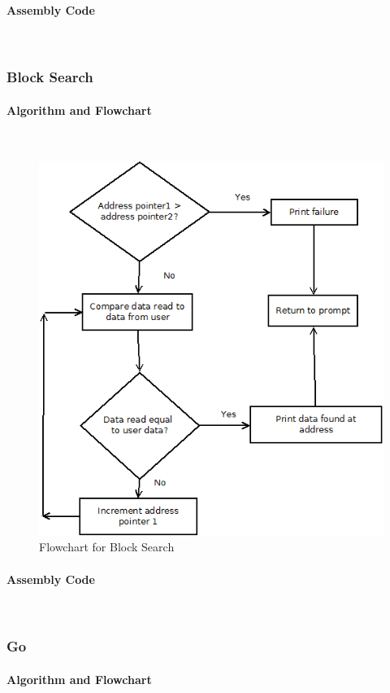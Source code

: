 \documentclass[12pt]{article}
\begin{document}
			\paragraph{Assembly Code}~\\				%
			
			\subsubsection{Block Search}
			\paragraph{Algorithm and Flowchart}~\\
			
			
			
\begin{figure}[H]
\centering
\includegraphics[width=0.7\linewidth]{BSearch}
\caption{Flowchart for Block Search}
\label{fig:BSearch}
\end{figure}
			\paragraph{Assembly Code}~\\				%
			
			\subsubsection{Go}
			\paragraph{Algorithm and Flowchart}~\\
			
\end{document}
